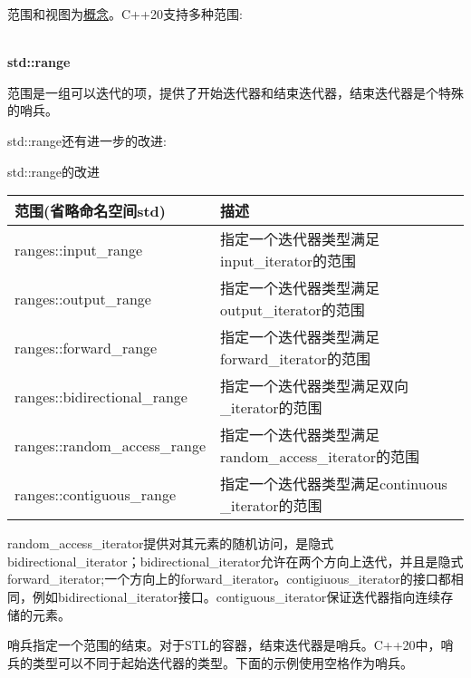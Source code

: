 范围和视图为\href{https://en.cppreference.com/w/cpp/language/constraint}{概念}。C++20支持多种范围:

\hspace*{\fill} \\
\noindent
\textbf{std::range}

范围是一组可以迭代的项，提供了开始迭代器和结束迭代器，结束迭代器是个特殊的哨兵。

std::range还有进一步的改进:

\begin{center}
std::range的改进
\end{center}

\begin{longtable}[c]{|l|l|}
\hline
\textbf{范围(省略命名空间std)} & \textbf{描述}                                              \\ \hline
\endfirsthead
%
\endhead
%
ranges::input\_range                  & 指定一个迭代器类型满足input\_iterator的范围   \\ \hline
ranges::output\_range                 & 指定一个迭代器类型满足output\_iterator的范围  \\ \hline
ranges::forward\_range                & 指定一个迭代器类型满足forward\_iterator的范围 \\ \hline
ranges::bidirectional\_range  & 指定一个迭代器类型满足双向\_iterator的范围  \\ \hline
ranges::random\_access\_range & 指定一个迭代器类型满足random\_access\_iterator的范围 \\ \hline
ranges::contiguous\_range     & 指定一个迭代器类型满足continuous \_iterator的范围      \\ \hline
\end{longtable}


random\_access\_iterator提供对其元素的随机访问，是隐式bidirectional\_iterator；bidirectional\_iterator允许在两个方向上迭代，并且是隐式forward\_iterator;一个方向上的forward\_iterator。contigiuous\_iterator的接口都相同，例如bidirectional\_iterator接口。contiguous\_iterator保证迭代器指向连续存储的元素。


哨兵指定一个范围的结束。对于STL的容器，结束迭代器是哨兵。C++20中，哨兵的类型可以不同于起始迭代器的类型。下面的示例使用空格作为哨兵。


